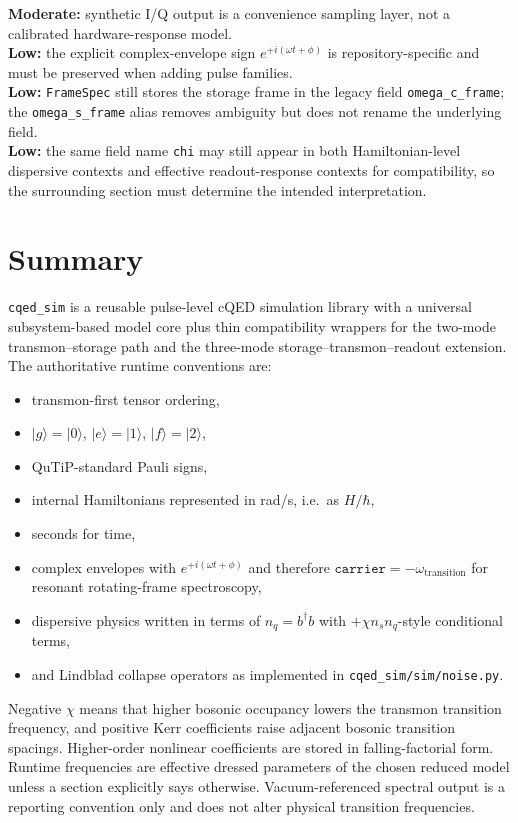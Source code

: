\documentclass[11pt]{article}
\begin{document}
\textbf{Moderate:} synthetic I/Q output is a convenience sampling layer, not a
calibrated hardware-response model.\\

\textbf{Low:} the explicit complex-envelope sign \(e^{+i(\omega t+\phi)}\) is
repository-specific and must be preserved when adding pulse families.\\

\textbf{Low:} \texttt{FrameSpec} still stores the storage frame in the legacy field
\texttt{omega\_c\_frame}; the \texttt{omega\_s\_frame} alias removes ambiguity but
does not rename the underlying field.\\

\textbf{Low:} the same field name \texttt{chi} may still appear in both Hamiltonian-level
dispersive contexts and effective readout-response contexts for compatibility, so
the surrounding section must determine the intended interpretation.

\section{Summary}
\texttt{cqed\_sim} is a reusable pulse-level cQED simulation library with a
universal subsystem-based model core plus thin compatibility wrappers for the
two-mode transmon--storage path and the three-mode storage--transmon--readout
extension. The authoritative runtime conventions are:
\begin{itemize}[leftmargin=1.5em]
  \item transmon-first tensor ordering,
  \item \(|g\rangle=|0\rangle\), \(|e\rangle=|1\rangle\), \(|f\rangle=|2\rangle\),
  \item QuTiP-standard Pauli signs,
  \item internal Hamiltonians represented in rad/s, i.e.\ as \(H/\hbar\),
  \item seconds for time,
  \item complex envelopes with \(e^{+i(\omega t+\phi)}\) and therefore
  \(\texttt{carrier}=-\omega_{\mathrm{transition}}\) for resonant rotating-frame spectroscopy,
  \item dispersive physics written in terms of \(n_q=b^\dagger b\) with
  \(+\chi n_s n_q\)-style conditional terms,
  \item and Lindblad collapse operators as implemented in \texttt{cqed\_sim/sim/noise.py}.
\end{itemize}

\noindent
Negative \(\chi\) means that higher bosonic occupancy lowers the transmon transition
frequency, and positive Kerr coefficients raise adjacent bosonic transition spacings.
Higher-order nonlinear coefficients are stored in falling-factorial form. Runtime
frequencies are effective dressed parameters of the chosen reduced model unless a
section explicitly says otherwise. Vacuum-referenced spectral output is a reporting
convention only and does not alter physical transition frequencies.
\end{document}
